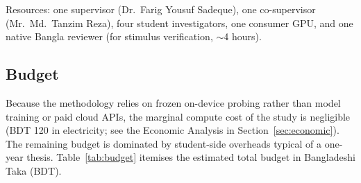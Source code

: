 Resources: one supervisor (Dr.\ Farig Yousuf Sadeque), one co-supervisor (Mr.\ Md.\ Tanzim Reza), four student investigators, one consumer GPU, and one native Bangla reviewer (for stimulus verification, $\sim$4 hours).

\subsection*{Budget}

Because the methodology relies on frozen on-device probing rather than model training or paid cloud APIs, the marginal compute cost of the study is negligible (BDT 120 in electricity; see the Economic Analysis in Section~\ref{sec:economic}). The remaining budget is dominated by student-side overheads typical of a one-year thesis. Table~\ref{tab:budget} itemises the estimated total budget in Bangladeshi Taka (BDT).

\begin{table}[H]
\centering
\caption{Estimated one-year thesis budget (BDT). Compute is the smallest line item; the budget is dominated by connectivity and thesis-production overheads.}
\label{tab:budget}
\small
{}
\end{table}

